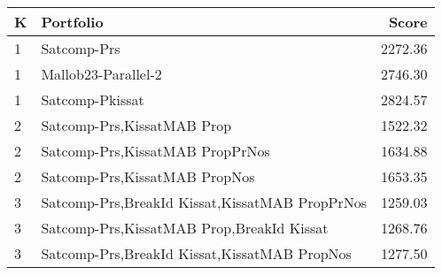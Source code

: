 \begin{tabular}{l|p{.9\linewidth}|r}
\toprule
K & Portfolio & Score \\
\midrule
1 & Satcomp-Prs & 2272.36 \\
1 & Mallob23-Parallel-2 & 2746.30 \\
1 & Satcomp-Pkissat & 2824.57 \\
2 & Satcomp-Prs,KissatMAB Prop & 1522.32 \\
2 & Satcomp-Prs,KissatMAB PropPrNos & 1634.88 \\
2 & Satcomp-Prs,KissatMAB PropNos & 1653.35 \\
3 & Satcomp-Prs,BreakId Kissat,KissatMAB PropPrNos & 1259.03 \\
3 & Satcomp-Prs,KissatMAB Prop,BreakId Kissat & 1268.76 \\
3 & Satcomp-Prs,BreakId Kissat,KissatMAB PropNos & 1277.50 \\
\bottomrule
\end{tabular}
